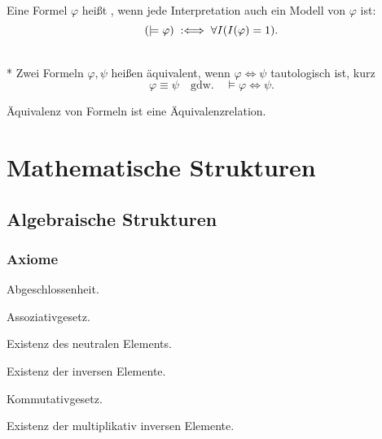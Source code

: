 \begin{definition}[Tautologie]\mbox{}\newline
Eine Formel $\varphi$ heißt ,
wenn jede Interpretation auch ein Modell von $\varphi$ ist:
\begin{equation}\label{eq:tautologisch}
(\models\varphi) \;:\Longleftrightarrow\; \forall I(I(\varphi)=1).
\end{equation}
\end{definition}

\begin{definition}\mbox{}\\*
Zwei Formeln $\varphi,\psi$ heißen äquivalent, wenn
$\varphi\Leftrightarrow\psi$ tautologisch ist, kurz
\begin{equation}\label{eq:aequivalente-Formeln}
\varphi\equiv\psi\quad\text{gdw.}\quad \models\varphi\Leftrightarrow\psi.
\end{equation}
\end{definition}

\noindent
Äquivalenz von Formeln ist eine Äquivalenzrelation.

\section{Mathematische Strukturen}\label{sec:Strukturen}
\subsection{Algebraische Strukturen}
\subsubsection*{Axiome}

\noindent{} Abgeschlossenheit.

\noindent{} Assoziativgesetz.

\noindent{} Existenz des neutralen Elements.

\noindent{} Existenz der inversen Elemente.

\noindent{} Kommutativgesetz.

\noindent
{} Existenz der multiplikativ inversen Elemente.

